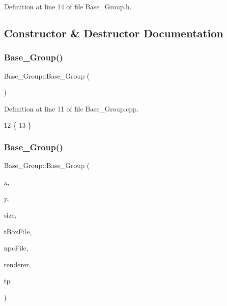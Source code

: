 Definition at line 14 of file Base\+\_\+\+Group.\+h.



\subsection{Constructor \& Destructor Documentation}
\mbox{\label{class_base___group_a96e70ee101d6430696f7b13b07190787}} 
\subsubsection{\texorpdfstring{Base\+\_\+\+Group()}{Base\_Group()}\hspace{0.1cm}{\footnotesize\ttfamily [1/2]}}
{\footnotesize\ttfamily Base\+\_\+\+Group\+::\+Base\+\_\+\+Group (\begin{DoxyParamCaption}{ }\end{DoxyParamCaption})}



Definition at line 11 of file Base\+\_\+\+Group.\+cpp.


\begin{DoxyCode}
12 \{
13 \}
\end{DoxyCode}
\mbox{\label{class_base___group_a056cdec4b61e453cd2125d5e0c5e3b57}} 
\subsubsection{\texorpdfstring{Base\+\_\+\+Group()}{Base\_Group()}\hspace{0.1cm}{\footnotesize\ttfamily [2/2]}}
{\footnotesize\ttfamily Base\+\_\+\+Group\+::\+Base\+\_\+\+Group (\begin{DoxyParamCaption}\item[{int}]{x,  }\item[{int}]{y,  }\item[{int}]{size,  }\item[{std\+::string}]{t\+Box\+File,  }\item[{std\+::string}]{npc\+File,  }\item[{S\+D\+L\+\_\+\+Renderer $\ast$}]{renderer,  }\item[{\hyperlink{class_topic}{Topic}}]{tp }\end{DoxyParamCaption})}



